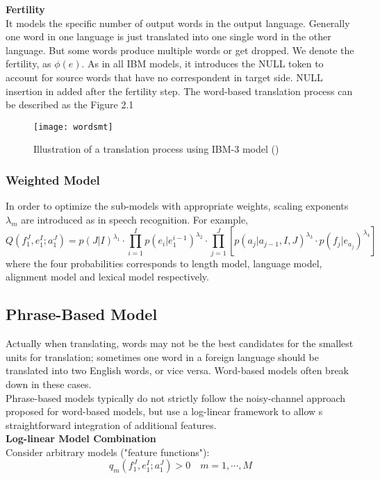 \textbf{Fertility} \\
It models the specific number of output words in the output language. Generally one word in one language is just translated into one single word in the other language. But some words produce multiple words or get dropped. We denote the fertility, as $\phi(e)$.  As in all IBM models, it introduces the NULL token to account for source words that have no correspondent in target side. NULL insertion in added after the fertility step. The word-based translation process can be described as the Figure 2.1 \cite{koehn2009statistical}
\begin{figure}[t]
	\centering
	\texttt{[image: wordsmt]}
	\caption{ Illustration of a translation process using IBM-3 model (\cite{koehn2009statistical})}

\end{figure}




\subsubsection{Weighted Model}
 In order to optimize the sub-models with appropriate weights, scaling exponents ${\lambda_{m}}$ are introduced as in speech recognition. For example,
\[ Q(f_1^J, e_1^I; a_1^J) = p(J|I)^{\lambda_1} \cdot \prod_{i=1}^{I} p(e_i|e_1^{i-1})^{\lambda_2} \cdot \prod_{j=1}^{J} [p(a_j|a_{j-1}, I, J)^{\lambda_{3}} \cdot p(f_j|e_{a_j})^{\lambda_4}]  \]
where the four probabilities corresponds to length model, language model, alignment model and lexical model respectively. 


\subsection{Phrase-Based Model}
Actually when translating, words may not be the best candidates for the smallest units for translation; sometimes one word in a foreign language should be translated into two English words, or vice versa. Word-based models often break down in these cases.\\
Phrase-based models typically do not strictly follow the noisy-channel approach proposed for word-based models, but use a log-linear framework to allow s straightforward integration of additional features.\\

\textbf{Log-linear Model Combination}\\
Consider arbitrary models ("feature functions"):
\[ q_m(f_1^J, e_1^I; a_1^J) > 0  \quad m = 1, \cdots, M\]

